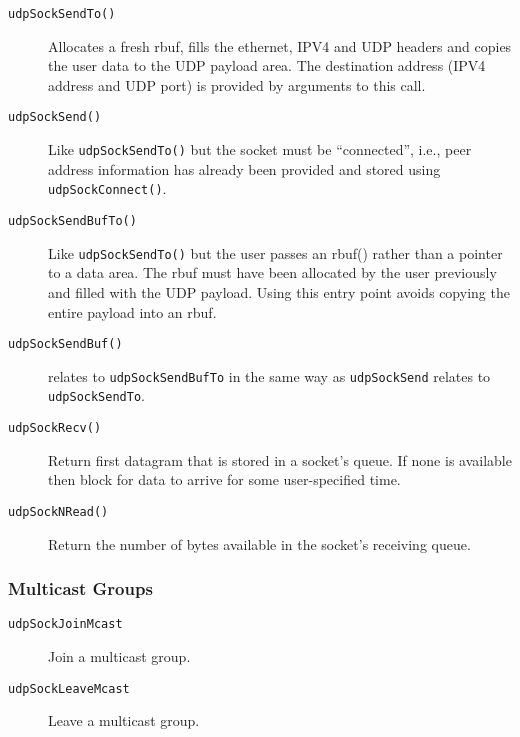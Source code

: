 \documentclass{article}
\newcommand{\ethn}{ethernet}
\newcommand{\rbuf}{{rbuf}}
\newcommand{\lipc}[1]{{\tt #1}}
\begin{document}
  \begin{description}
  \item[\lipc{udpSockSendTo()}] Allocates a fresh \rbuf{}, fills
  the \ethn{}, IPV4 and UDP headers and copies the user data to
  the UDP payload area. The destination address (IPV4 address and
  UDP port) is provided by arguments to this call.
  \item[\lipc{udpSockSend()}] Like \lipc{udpSockSendTo()} but the
  socket must be ``connected'', i.e., peer address information has
  already been provided and stored using \lipc{udpSockConnect()}.
  \item[\lipc{udpSockSendBufTo()}] Like \lipc{udpSockSendTo()} but
  the user passes an \rbuf() rather than a pointer to a data area.
  The \rbuf{} must have been allocated by the user previously and
  filled with the UDP payload. Using this entry point avoids
  copying the entire payload into an \rbuf{}.
  \item[\lipc{udpSockSendBuf()}] relates to \lipc{udpSockSendBufTo}
  in the same way as \lipc{udpSockSend} relates to \lipc{udpSockSendTo}.
  \item[\lipc{udpSockRecv()}] Return first datagram that is
  stored in a socket's queue. If none is available then block
  for data to arrive for some user-specified time.
  \item[\lipc{udpSockNRead()}] Return the number of bytes available
  in the socket's receiving queue.
  \end{description}

  \subsubsection{Multicast Groups}
  \begin{description}
  \item[\lipc{udpSockJoinMcast}] Join a multicast group.
  \item[\lipc{udpSockLeaveMcast}] Leave a multicast group.
  \end{description}
\end{document}
